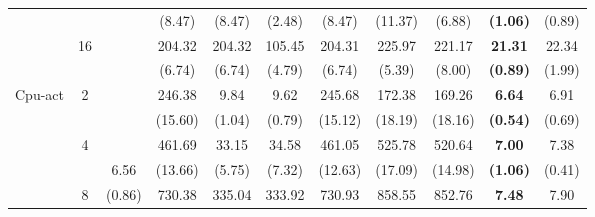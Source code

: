 \documentclass[letterpaper]{article} %
\begin{document}
\begin{table}[!t]
{\begin{tabular}{clcccccccc|cc}
\multicolumn{2}{c}{}                             &                       &                             & (8.47)                    & (8.47)                    & (2.48)                      & (8.47)                    & (11.37)                   & (6.88)                      & \textbf{(1.06)}     & (0.89)                \\
\multicolumn{2}{c}{}                             & \multirow{2}{*}{16}   &                             & 204.32                    & 204.32                    & 105.45                      & 204.31                    & 225.97                    & 221.17                      & \textbf{21.31}      & 22.34                 \\
\multicolumn{2}{c}{}                             &                       &                             & (6.74)                    & (6.74)                    & (4.79)                      & (6.74)                    & (5.39)                    & (8.00)                      & \textbf{(0.89)}     & (1.99)                \\ \hline
\multicolumn{2}{c}{\multirow{8}{*}{Cpu-act}}     & \multirow{2}{*}{2}    &                             & 246.38                    & 9.84                      & 9.62                        & 245.68                    & 172.38                    & 169.26                      & \textbf{6.64}       & 6.91                  \\
\multicolumn{2}{c}{}                             &                       &                             & (15.60)                   & (1.04)                    & (0.79)                      & (15.12)                   & (18.19)                   & (18.16)                     & \textbf{(0.54)}     & (0.69)                \\
\multicolumn{2}{c}{}                             & \multirow{2}{*}{4}    &                             & 461.69                    & 33.15                     & 34.58                       & 461.05                    & 525.78                    & 520.64                      & \textbf{7.00}       & 7.38                  \\
\multicolumn{2}{c}{}                             &                       & 6.56                        & (13.66)                   & (5.75)                    & (7.32)                      & (12.63)                   & (17.09)                   & (14.98)                     & \textbf{(1.06)}     & (0.41)                \\
\multicolumn{2}{c}{}                             & \multirow{2}{*}{8}    & (0.86)                      & 730.38                    & 335.04                    & 333.92                      & 730.93                    & 858.55                    & 852.76                      & \textbf{7.48}       & 7.90                  \\

\end{tabular}}
\end{table}
\end{document}
